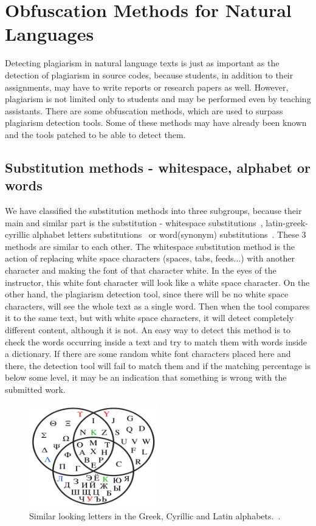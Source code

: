 \documentclass[12pt]{article}
\begin{document}
\section{Obfuscation Methods for Natural Languages}\label{sec:Obfuscation Methods for Natural Languages}
Detecting plagiarism in natural language texts is just as important as the detection of plagiarism in source codes, because students, in addition to their assignments, may have to write reports or research papers as well. However, plagiarism is not limited only to students and may be performed even by teaching assistants. There are some obfuscation methods, which are used to surpass plagiarism detection tools. Some of these methods may have already been known and the tools patched to be able to detect them.

\subsection{Substitution methods - whitespace, alphabet or words} \label{sec:Substitution methods - whitespace, alphabet or words}
We have classified the substitution methods into three subgroups, because their main and similar part is the substitution - whitespace substitutions~\cite{plainTextPlag}, latin-greek-cyrillic alphabet letters substitutions~\cite{plainTextPlag} or word(synonym) substitutions~\cite{plainTextPlag2}. These 3 methods are similar to each other. The whitespace substitution method is the action of replacing white space characters (spaces, tabs, feeds...) with another character and making the font of that character white. In the eyes of the instructor, this white font character will look like a white space character. On the other hand, the plagiarism detection tool, since there will be no white space characters, will see the whole text as a single word. Then when the tool compares it to the same text, but with white space characters, it will detect completely different content, although it is not. An easy way to detect this method is to check the words occurring inside a text and try to match them with words inside a dictionary. If there are some random white font characters placed here and there, the detection tool will fail to match them and if the matching percentage is below some level, it may be an indication that something is wrong with the submitted work. 

\begin{figure} [ht]
    \centering
    \includegraphics[width=0.50\textwidth]{../images/vennAlphabet.png}
    \caption{Similar looking letters in the Greek, Cyrillic and Latin alphabets.~\cite{vennDiagram}.}
    \label{fig:vennDiagram}
\end{figure}
\end{document}
